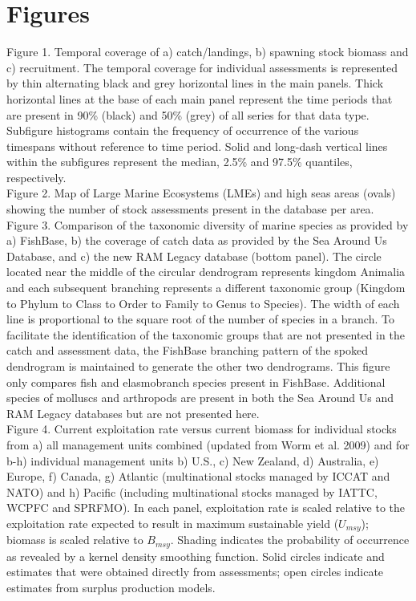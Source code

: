 \documentclass[letterpaper,12pt]{article}
\begin{document}

\section*{Figures}
\noindent Figure 1. Temporal coverage of a) catch/landings, b) spawning stock biomass and c) recruitment. The temporal coverage for individual assessments is represented by thin alternating black and grey horizontal lines in the main panels. Thick horizontal lines at the base of each main panel represent the time periods that are present in 90\% (black) and 50\% (grey) of all series for that data type. Subfigure histograms contain the frequency of occurrence of the various timespans without reference to time period. Solid and long-dash vertical lines within the subfigures represent the median, 2.5\% and 97.5\% quantiles, respectively.
\\

\noindent Figure 2. Map of Large Marine Ecosystems (LMEs) and high seas areas (ovals) showing the number of stock assessments present in the database per area. 
\\

\noindent Figure 3. Comparison of the taxonomic diversity of marine species as provided by a)
FishBase, b) the coverage of catch data as provided by the Sea Around Us
Database, and c) the new RAM Legacy database (bottom panel). The circle
located near the middle of the circular dendrogram represents kingdom Animalia and
each subsequent branching represents a different taxonomic group (Kingdom to Phylum
to Class to Order to Family to Genus to Species). The width of each line is proportional
to the square root of the number of species in a branch. To facilitate the identification
of the taxonomic groups that are not presented in the catch and assessment data, the
FishBase branching pattern of the spoked dendrogram is maintained to generate the
other two dendrograms. This figure only compares fish and elasmobranch species present in FishBase. Additional species of molluscs and arthropods are present in both the Sea Around Us and RAM Legacy databases but are not presented here.
\\

\noindent Figure 4.  Current exploitation rate versus current biomass for individual stocks from a) all management units combined (updated from Worm et al. 2009) and for b-h) individual management units b) U.S., c) New Zealand, d) Australia, e) Europe, f) Canada, g) Atlantic (multinational stocks managed by ICCAT and NATO) and h) Pacific (including multinational stocks managed by IATTC, WCPFC and SPRFMO). In each panel, exploitation rate is scaled relative to the exploitation rate expected to result in maximum sustainable yield ($U_{msy}$); biomass is scaled relative to $B_{msy}$. Shading indicates the probability of occurrence as revealed by a kernel density smoothing function. Solid circles indicate and estimates that were obtained directly from assessments; open circles indicate estimates from surplus production models. 
\\
\end{document}
